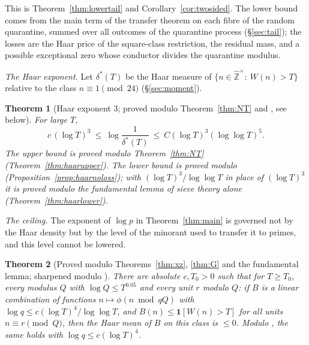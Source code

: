 \documentclass[11pt,reqno]{amsart}
\newtheorem{theorem}{Theorem}[section]
\theoremstyle{definition}
\begin{document}
This is Theorem~\ref{thm:lowertail} and Corollary~\ref{cor:twosided}.  The
lower bound comes from the main term of the transfer theorem on each fibre
of the random quarantine, summed over all outcomes of the quarantine
process (\S\ref{sec:tail}); the losses are the Haar price of the square-class
restriction, the residual mass, and a possible exceptional zero whose
conductor divides the quarantine modulus.

\emph{The Haar exponent.}  Let $\delta^*(T)$ be the Haar measure of
$\{n\in\hat{\mathbb Z}^\times:\ W(n)>T\}$ relative to the class $n\equiv1\pmod{24}$
(\S\ref{sec:moment}).

\begin{theorem}[Haar exponent $3$; proved modulo Theorem~\ref{thm:NT} and \cite{TQ}, see below]\label{thm:haar}
For large $T$,
\[
 c\,(\log T)^3\ \le\ \log\frac1{\delta^*(T)}\ \le\ C(\log T)^3(\log\log T)^5 .
\]
The upper bound is proved modulo Theorem~\ref{thm:NT}
(Theorem~\ref{thm:haarupper}).  The lower bound is proved modulo \cite{TQ}
(Proposition~\ref{prop:haarnoloss}); with $(\log T)^3/\log\log T$ in place of
$(\log T)^3$ it is proved modulo the fundamental lemma of sieve theory alone
(Theorem~\ref{thm:haarlower}).
\end{theorem}

\emph{The ceiling.}  The exponent of $\log p$ in Theorem~\ref{thm:main} is
governed not by the Haar density but by the level of the minorant used to
transfer it to primes, and this level cannot be lowered.

\begin{theorem}[Proved modulo Theorems~\ref{thm:xz}, \ref{thm:G} and the fundamental lemma; sharpened modulo \cite{TQ}]\label{thm:ceilingintro}
There are absolute $c,T_0>0$ such that for $T\ge T_0$, every modulus $Q$ with
$\log Q\le T^{0.05}$ and every unit $r$ modulo $Q$: if $B$ is a linear
combination of functions $n\mapsto\phi(n\bmod qQ)$ with
$\log q\le c(\log T)^4/\log\log T$, and $B(n)\le\mathbf 1[W(n)>T]$ for all units
$n\equiv r\pmod Q$, then the Haar mean of $B$ on this class is $\le0$.  Modulo
\cite{TQ}, the same holds with $\log q\le c(\log T)^4$.
\end{theorem}
\end{document}
